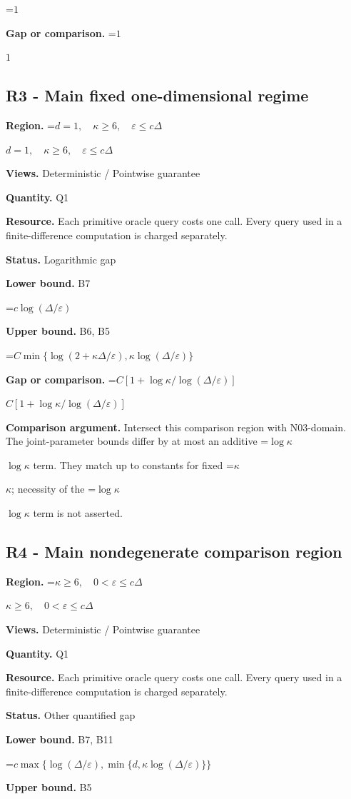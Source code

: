 \documentclass[10pt,a4paper]{article}
\newcommand{\AtlasMath}[1]{\par\begingroup\centering\setbox0=\hbox{$\displaystyle #1$}\ifdim\wd0>1.4\linewidth\typeout{ATLAS WIDE FORMULA: \the\wd0}\fi\ifdim\wd0>\linewidth\resizebox{\linewidth}{!}{\box0}\else\box0\fi\par\endgroup}
\newcommand{\AtlasInlineMath}[1]{\begingroup\setbox0=\hbox{$#1$}\ifdim\wd0>.4\linewidth\endgroup\AtlasMath{#1}\else\endgroup$#1$\fi}
\begin{document}
\AtlasMath{1}
\textbf{Gap or comparison.} \AtlasInlineMath{1}

\subsection{R3 - Main fixed one-dimensional regime}
\textbf{Region.} \AtlasInlineMath{d=1,\quad\kappa\ge6,\quad\varepsilon\le c\Delta}

\textbf{Views.} Deterministic / Pointwise guarantee

\textbf{Quantity.} Q1

\textbf{Resource.} Each primitive oracle query costs one call. Every query used in a finite-difference computation is charged separately.

\textbf{Status.} Logarithmic gap

\textbf{Lower bound.} B7

\AtlasMath{c\log(\Delta/\varepsilon)}
\textbf{Upper bound.} B6, B5

\AtlasMath{C\min\{\log(2+\kappa\Delta/\varepsilon),\kappa\log(\Delta/\varepsilon)\}}
\textbf{Gap or comparison.} \AtlasInlineMath{C[1+\log\kappa/\log(\Delta/\varepsilon)]}

\textbf{Comparison argument.} Intersect this comparison region with N03-domain. The joint-parameter bounds differ by at most an additive \AtlasInlineMath{\log\kappa} term. They match up to constants for fixed \AtlasInlineMath{\kappa}; necessity of the \AtlasInlineMath{\log\kappa} term is not asserted.

\subsection{R4 - Main nondegenerate comparison region}
\textbf{Region.} \AtlasInlineMath{\kappa\ge6,\quad0<\varepsilon\le c\Delta}

\textbf{Views.} Deterministic / Pointwise guarantee

\textbf{Quantity.} Q1

\textbf{Resource.} Each primitive oracle query costs one call. Every query used in a finite-difference computation is charged separately.

\textbf{Status.} Other quantified gap

\textbf{Lower bound.} B7, B11

\AtlasMath{c\max\{\log(\Delta/\varepsilon),\min\{d,\kappa\log(\Delta/\varepsilon)\}\}}
\textbf{Upper bound.} B5
\end{document}

